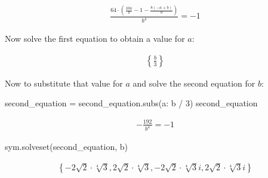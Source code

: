 \begin{equation*}
\begin{split}\displaystyle \frac{64 \cdot \left(\frac{10 a}{b} - 1 - \frac{8 \left(- a + b\right)}{b}\right)}{b^{4}} = -1\end{split}
\end{equation*}




Now solve the first equation to obtain a value for \(a\):




\begin{pyin}
 
\end{pyin}




\begin{equation*}
\begin{split}\displaystyle \left\{\frac{b}{3}\right\}\end{split}
\end{equation*}




Now to substitute that value for \(a\) and solve the second equation for \(b\):




\begin{pyin}
second_equation = second_equation.subs({a: b / 3})
second_equation
\end{pyin}




\begin{equation*}
\begin{split}\displaystyle - \frac{192}{b^{4}} = -1\end{split}
\end{equation*}






\begin{pyin}
sym.solveset(second_equation, b)
\end{pyin}




\begin{equation*}
\begin{split}\displaystyle \left\{- 2 \sqrt{2} \cdot \sqrt[4]{3}, 2 \sqrt{2} \cdot \sqrt[4]{3}, - 2 \sqrt{2} \cdot \sqrt[4]{3} i, 2 \sqrt{2} \cdot \sqrt[4]{3} i\right\}\end{split}
\end{equation*}




